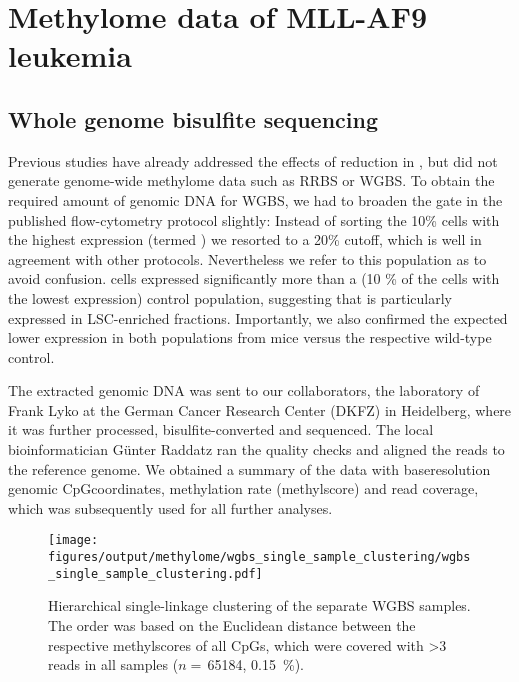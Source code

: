 \chapter{Methylome data of MLL-AF9 leukemia}
\setcounter{section}{-1}
\section{Whole genome bisulfite sequencing}
\label{chap:r:wgbs:single_sample_clustering}


Previous studies have already addressed the effects of  reduction in \mllafnine \cite{Broeske2009,Trowbridge2012}, but did not generate genome-wide methylome data such as RRBS or WGBS. To obtain the required amount of genomic DNA for WGBS, we had to broaden the \kit gate in the published flow-cytometry protocol\cite{Krivtsov2006}  slightly: Instead of sorting the 10\% cells with the highest \kit expression (termed \kithi) we resorted to a 20\% cutoff, which is well in agreement with other protocols\cite{Somervaille2006}. Nevertheless we refer to this population as \kitpos to avoid confusion. \mllafnine \dnmtwt \kitpos cells expressed significantly more  than a \kitlow (10 \% of the cells with the lowest \kit expression) control population, suggesting that  is particularly expressed in LSC-enriched fractions. Importantly, we also confirmed the expected lower  expression in both populations from \dnmtchip mice versus the respective wild-type control.

The extracted genomic DNA was sent to our collaborators, the laboratory of Frank Lyko at the German Cancer Research Center (DKFZ) in Heidelberg, where it was further processed, bisulfite-converted and sequenced. The local bioinformatician Günter Raddatz ran the quality checks and aligned the reads to the \mmnine reference genome. We obtained a summary of the data with baseresolution genomic CpGcoordinates, methylation rate (methylscore) and read coverage, which was subsequently used for all further analyses. 


\begin{figure}[!ht] 
	\centering
	\texttt{[image: figures/output/methylome/wgbs\_single\_sample\_clustering/wgbs\_single\_sample\_clustering.pdf]} 
	\caption[Hierarchical clustering of separate WGBS samples]{Hierarchical single-linkage clustering of the separate WGBS samples. The order was based on the Euclidean distance between the respective methylscores of all CpGs, which were covered with >3 reads in all samples (\ensuremath{n=\,}\num{65184}, \SI{0.15}{\percent}).}
	\label{fig:wgbs:single:sample:clustering}
\end{figure}

